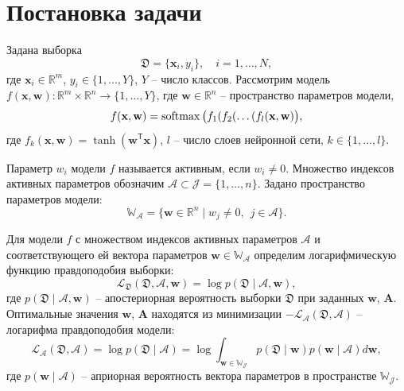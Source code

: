 \newpage


\section{Постановка задачи}
Задана выборка 
\begin{equation} \label{task.1} 
\mathfrak{D} = \{\mathbf{x}_i, y_i\}, \quad i = 1, \ldots, N,
\end{equation}
где $\mathbf{x}_i \in \mathbb{R}^m$, $y_i \in \{1, \ldots, Y\}$, $Y$ -- число классов. Рассмотрим модель $f(\mathbf{x}, \mathbf{w}): \mathbb{R}^m \times \mathbb{R}^n \to \{1, \ldots, Y\}$, где $\mathbf{w} \in \mathbb{R}^n$ -- пространство параметров модели,
\begin{equation} \label{task.2} 
f(\mathbf{x}, \mathbf{w}) = \operatorname{softmax} \big(f_1(f_2(\ldots(f_l(\mathbf{x}, \mathbf{w})\big),
\end{equation}
где $f_k(\mathbf{x}, \mathbf{w}) = \tanh(\mathbf{w}^{\mathsf{T}}\mathbf{x})$, $l$ -- число слоев нейронной сети, $k \in \{1, \ldots, l\}$. 

Параметр $w_i$ модели $f$ называется активным, если $w_i \neq 0$. Множество индексов активных параметров обозначим $\mathcal{A} \subset \mathcal{J} = \{1, \ldots, n\}$. Задано пространство параметров модели:
\begin{equation} \label{task.3} 
\mathbb{W}_{\mathcal{A}} = \{\mathbf{w} \in \mathbb{R}^n \mid w_j \neq 0, \hspace{5pt} j \in \mathcal{A}\}.
\end{equation}

Для модели $f$ с множеством индексов активных параметров $\mathcal{A}$ и соответствующего ей вектора параметров $\mathbf{w} \in \mathbb{W}_{\mathcal{A}}$ определим логарифмическую функцию правдоподобия выборки:
\begin{equation} \label{task.4} 
\mathcal{L}_{\mathfrak{D}}(\mathfrak{D}, \mathcal{A}, \mathbf{w}) = \log p(\mathfrak{D} \mid \mathcal{A}, \mathbf{w}), 
\end{equation}
где $p(\mathfrak{D} \mid \mathcal{A}, \mathbf{w})$ -- апостериорная вероятность выборки $\mathfrak{D}$ при заданных $\mathbf{w}$, $\mathbf{A}$. Оптимальные значения $\mathbf{w}$, $\mathbf{A}$ находятся из минимизации $-\mathcal{L}_{\mathcal{A}}(\mathfrak{D}, \mathcal{A})$ -- логарифма правдоподобия модели:
\begin{equation} \label{task.5} 
\mathcal{L}_{\mathcal{A}}(\mathfrak{D}, \mathcal{A}) = \log p(\mathfrak{D} \mid \mathcal{A}) = \log \int_{\mathbf{w \in \mathbb{W}_{\mathcal{J}}}} p(\mathfrak{D} \mid \mathbf{w})p(\mathbf{w} \mid \mathcal{A}) d \mathbf{w},
\end{equation}
где $p(\mathbf{w} \mid \mathcal{A})$ -- априорная вероятность вектора параметров в пространстве $\mathbb{W}_{\mathcal{J}}$.

